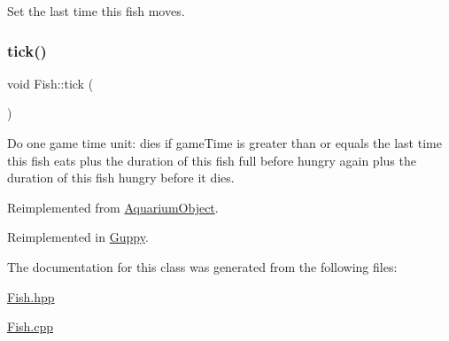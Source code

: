 Set the last time this fish moves. 

\mbox{\label{class_fish_aa49a70677a400c471b1e3db5d8f1881e}} 
\subsubsection{\texorpdfstring{tick()}{tick()}}
{\footnotesize\ttfamily void Fish\+::tick (\begin{DoxyParamCaption}{ }\end{DoxyParamCaption})\hspace{0.3cm}{\ttfamily [virtual]}}



Do one game time unit\+: dies if game\+Time is greater than or equals the last time this fish eats plus the duration of this fish full before hungry again plus the duration of this fish hungry before it dies. 



Reimplemented from \mbox{\hyperlink{class_aquarium_object_a3a8269dfe29631656916cce254e77059}{Aquarium\+Object}}.



Reimplemented in \mbox{\hyperlink{class_guppy_ab2f219fa29b0d22ee9702a55fede519b}{Guppy}}.



The documentation for this class was generated from the following files\+:\begin{DoxyCompactItemize}
\item 
\mbox{\hyperlink{_fish_8hpp}{Fish.\+hpp}}\item 
\mbox{\hyperlink{_fish_8cpp}{Fish.\+cpp}}\end{DoxyCompactItemize}
